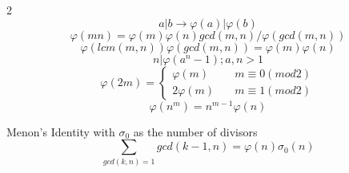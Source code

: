 \begin{large}
  \begin{multicols}{2}
    $$a | b \to \varphi(a) | \varphi(b) $$
    $$\varphi(mn) = \varphi(m) \varphi(n) gcd(m,n) / \varphi(gcd(m,n))$$
    $$\varphi(lcm(m,n)) \varphi(gcd(m,n)) = \varphi(m) \varphi(n)$$
    $$n | \varphi(a^{n}-1) ; a,n > 1$$
    $$\varphi(2m) =
      \left\{\begin{array}{ll}
        \varphi(m) & \quad m \equiv 0 (mod 2) \\
        2\varphi(m) & \quad m \equiv 1 (mod 2)
      \end{array}\right.
    $$
    $$\varphi(n^m) = n^{m-1} \varphi(n)$$
  \end{multicols}
  Menon's Identity with $\sigma_0$ as the number of divisors
  $$\sum_{gcd(k,n)=1} gcd(k-1,n) = \varphi(n) \sigma_0(n)$$
\end{large}
